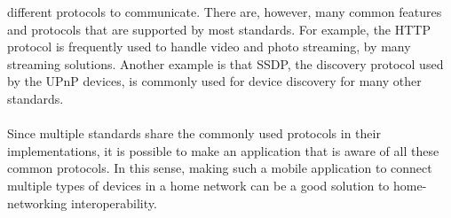 different protocols to communicate. There are, however, many common features and protocols that are supported by most standards. For example, the HTTP protocol is frequently used to handle video 
and photo streaming, by many streaming solutions. Another example is that SSDP, the discovery protocol used by the UPnP devices, is commonly used for device discovery for many other standards. \\
\\
Since multiple standards share the commonly used protocols in their implementations, it is possible to make an application that is aware of all these common protocols. In this sense, making such a mobile application to connect multiple types of devices in a home network can be a good solution to home-networking interoperability. 
